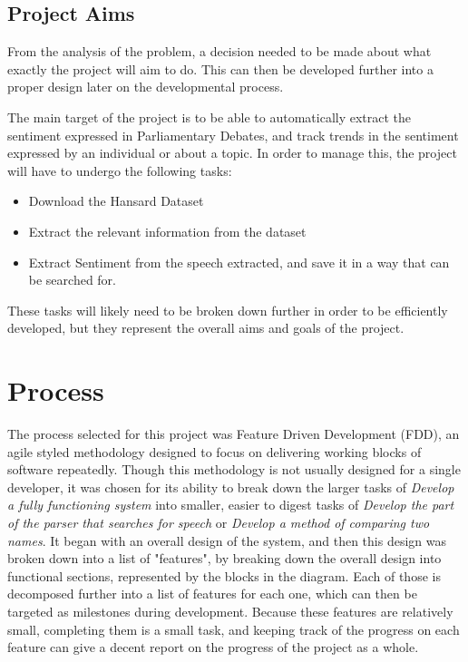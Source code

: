 \subsection{Project Aims}
\label{sec:bck_project_aims}
From the analysis of the problem, a decision needed to be made about what exactly the project will aim to do. This can then be developed further into a proper design later on the developmental process.

The main target of the project is to be able to automatically extract the sentiment expressed in Parliamentary Debates, and track trends in the sentiment expressed by an individual or about a topic. In order to manage this, the project will have to undergo the following tasks:
\begin{itemize}
	\item Download the Hansard Dataset
	\item Extract the relevant information from the dataset
	\item Extract Sentiment from the speech extracted, and save it in a way that can be searched for.
\end{itemize}

These tasks will likely need to be broken down further in order to be efficiently developed, but they represent the overall aims and goals of the project.

\section{Process}
\label{sec:bck_process}
The process selected for this project was Feature Driven Development (FDD), an agile styled methodology designed to focus on delivering working blocks of software repeatedly. Though this methodology is not usually designed for a single developer, it was chosen for its ability to break down the larger tasks of \emph{Develop a fully functioning system} into smaller, easier to digest tasks of \emph{Develop the part of the parser that searches for speech} or \emph{Develop a method of comparing two names}. It began with an overall design of the system, and then this design was broken down into a list of "features", by breaking down the overall design into functional sections, represented by the blocks in the diagram. Each of those is decomposed further into a list of features for each one, which can then be targeted as milestones during development. Because these features are relatively  small, completing them is a small task, and keeping track of the progress on each feature can give a decent report on the progress of the project as a whole.

